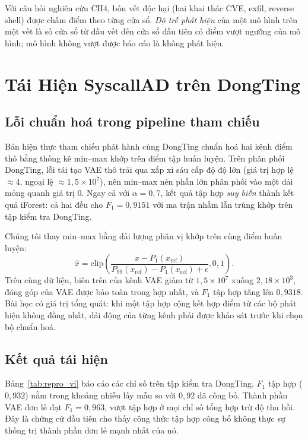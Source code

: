 Với câu hỏi nghiên cứu CH4, bốn vết độc hại (hai khai thác CVE, exfil,
reverse shell) được chấm điểm theo từng cửa sổ. \emph{Độ trễ phát hiện}
của một mô hình trên một vết là số cửa sổ từ đầu vết đến cửa sổ đầu
tiên có điểm vượt ngưỡng của mô hình; mô hình không vượt được báo cáo
là không phát hiện.

\FloatBarrier
\section{Tái Hiện SyscallAD trên DongTing}
\label{sec:reproduction_vi}

\subsection{Lỗi chuẩn hoá trong pipeline tham chiếu}
\label{subsec:normfix_vi}
Bản hiện thực tham chiếu phát hành cùng DongTing chuẩn hoá hai kênh
điểm thô bằng thống kê min--max khớp trên điểm tập huấn luyện. Trên
phân phối DongTing, lỗi tái tạo VAE thô trải qua xấp xỉ sáu cấp độ
độ lớn (giá trị hợp lệ $\approx\!4$, ngoại lệ
$\approx\!1{,}5\times10^{7}$), nên min--max nén phần lớn phân phối
vào một dải mỏng quanh giá trị 0. Ngay cả với $\alpha=0{,}7$, kết
quả tập hợp \emph{suy biến} thành kết quả iForest: cả hai đều cho
$F_{1}=0{,}9151$ với ma trận nhầm lẫn trùng khớp trên tập kiểm tra
DongTing.

Chúng tôi thay min--max bằng dải lượng phân vị khớp trên cùng điểm
huấn luyện:
\begin{equation}
\hat{x} = \mathrm{clip}\!\left(\frac{x - P_{1}(x_{\text{ref}})}
                                    {P_{99}(x_{\text{ref}}) -
                                     P_{1}(x_{\text{ref}}) + \epsilon},
                               0, 1\right).
\label{eq:robust_vi}
\end{equation}
Trên cùng dữ liệu, biên trên của kênh VAE giảm từ
$1{,}5\times10^{7}$ xuống $2{,}18\times10^{3}$, đóng góp của VAE được
bảo toàn trong hợp nhất, và $F_{1}$ tập hợp tăng lên $0{,}9318$. Bài
học có giá trị tổng quát: khi một tập hợp cộng kết hợp điểm từ các
bộ phát hiện không đồng nhất, dải động của từng kênh phải được khảo
sát trước khi chọn bộ chuẩn hoá.

\subsection{Kết quả tái hiện}
Bảng~\ref{tab:repro_vi} báo cáo các chỉ số trên tập kiểm tra DongTing.
$F_{1}$ tập hợp ($0{,}932$) nằm trong khoảng nhiễu lấy mẫu so với
$0{,}92$ đã công bố. Thành phần VAE đơn lẻ đạt $F_{1}=0{,}963$, vượt
tập hợp ở mọi chỉ số tổng hợp trừ độ thu hồi. Đây là chứng cứ đầu
tiên cho thấy công thức tập hợp công bố không thực sự thống trị
thành phần đơn lẻ mạnh nhất của nó.

